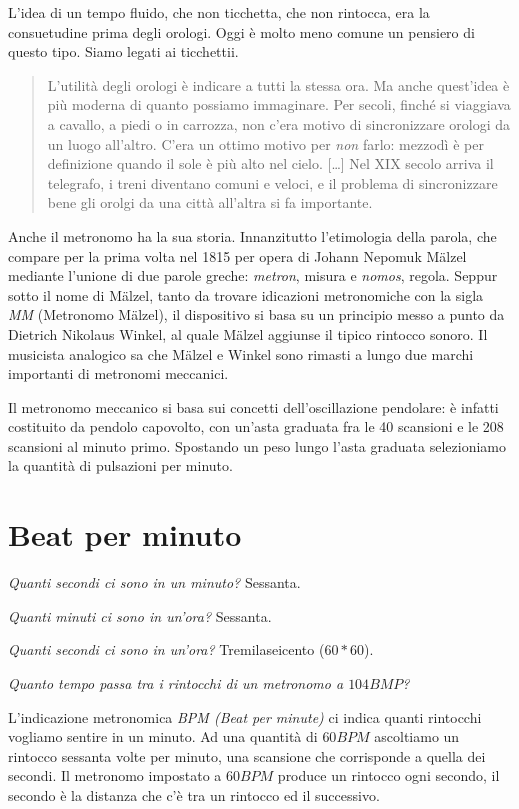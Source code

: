 L'idea di un tempo fluido, che non ticchetta, che non rintocca, era la consuetudine
prima degli orologi. Oggi è molto meno comune un pensiero di questo tipo. Siamo
legati ai ticchettii.
\begin{quote}
L'utilità degli orologi è indicare a tutti la stessa ora. Ma anche quest'idea è
più moderna di quanto possiamo immaginare. Per secoli, finché si viaggiava a
cavallo, a piedi o in carrozza, non c'era motivo di sincronizzare orologi da un
luogo all'altro. C'era un ottimo motivo per \emph{non} farlo: mezzodì è per
definizione quando il sole è più alto nel cielo. [\ldots] Nel XIX secolo arriva
il telegrafo, i treni diventano comuni e veloci, e il problema di sincronizzare
bene gli orolgi da una città all'altra si fa importante.
\end{quote}

Anche il metronomo ha la sua storia. Innanzitutto l'etimologia della parola,
che compare per la prima volta nel 1815 per opera di Johann Nepomuk M\"{a}lzel
mediante l'unione di due parole greche: \emph{metron}, misura e \emph{nomos}, regola.
Seppur sotto il nome di M\"{a}lzel, tanto da trovare idicazioni metronomiche
con la sigla \emph{MM} (Metronomo M\"{a}lzel), il dispositivo si basa su un
principio messo a punto da Dietrich Nikolaus Winkel, al quale M\"{a}lzel aggiunse
il tipico rintocco sonoro. Il musicista analogico sa che M\"{a}lzel e Winkel sono
rimasti a lungo due marchi importanti di metronomi meccanici.

Il metronomo meccanico si basa sui concetti dell'oscillazione pendolare:
è infatti costituito da pendolo capovolto, con un'asta graduata fra le 40 scansioni
e le 208 scansioni al minuto primo. Spostando un peso lungo l'asta graduata
selezioniamo la quantità di pulsazioni per minuto.

\section{Beat per minuto}

\emph{Quanti secondi ci sono in un minuto?} Sessanta.

\emph{Quanti minuti ci sono in un'ora?} Sessanta.

\emph{Quanti secondi ci sono in un'ora?} Tremilaseicento ($60*60$).

\emph{Quanto tempo passa tra i rintocchi di un metronomo a $104BMP$?}

L'indicazione metronomica \emph{BPM (Beat per minute)} ci indica quanti rintocchi
vogliamo sentire in un minuto. Ad una quantità di $60BPM$ ascoltiamo un rintocco
sessanta volte per minuto, una scansione che corrisponde a quella dei secondi.
Il metronomo impostato a $60BPM$ produce un rintocco ogni secondo, il secondo è
la distanza che c'è tra un rintocco ed il successivo.


